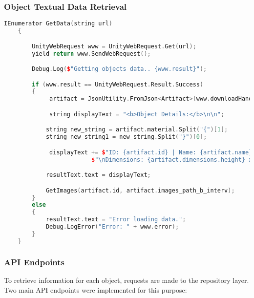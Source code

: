 \subsubsection{Object Textual Data Retrieval}
\begin{lstlisting}[language=C++]
      IEnumerator GetData(string url)
    {

        UnityWebRequest www = UnityWebRequest.Get(url);
        yield return www.SendWebRequest();

        Debug.Log($"Getting objects data.. {www.result}");

        if (www.result == UnityWebRequest.Result.Success)
        {
             artifact = JsonUtility.FromJson<Artifact>(www.downloadHandler.text);

             string displayText = "<b>Object Details:</b>\n\n";

            string new_string = artifact.material.Split("{")[1];
            string new_string1 = new_string.Split("}")[0];

             displayText += $"ID: {artifact.id} | Name: {artifact.name} \nMaterial: {new_string1} | Epoch: {artifact.epoch} \nProvenance: {artifact.provenance}" +
                         $"\nDimensions: {artifact.dimensions.height} x {artifact.dimensions.width} cm, Weight: {Mathf.Round(artifact.dimensions.weight * 10.0f) * 0.1f} g";

            resultText.text = displayText;

            GetImages(artifact.id, artifact.images_path_b_interv);
        }
        else
        {
            resultText.text = "Error loading data.";
            Debug.LogError("Error: " + www.error);
        }
    }
\end{lstlisting}

\subsubsection{API Endpoints}

To retrieve information for each object, requests are made to the repository layer. 
Two main API endpoints were implemented for this purpose:

